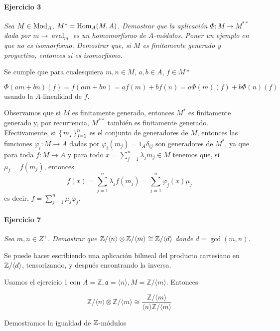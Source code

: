 \documentclass[./ejercicios.tex]{subfiles}
\begin{document}
\paragraph{Ejercicio 3}\textit{Sea $M\in \operatorname{Mod}_A$, $M^* = \operatorname{Hom}_A(M, A)$. Demostrar que la aplicación $\Phi:M\to M^{**}$ dada por $m \to \operatorname{eval}_m$ es un homomorfismo de $A$-módulos. Poner un ejemplo en que no es isomorfismo. Demostrar que, si $M$ es finitamente generado y proyectivo, entonces sí es isomorfismo.}

Se cumple que para cualesquiera $m, n \in M$, $a, b \in A$, $f\in M*$

\begin{equation}
  \Phi(a m+ bn) (f) = f(am+bn) = af(m)+bf(n) = a\Phi(m)(f)+b\Phi (n)(f)
\end{equation}
usando la $A$-linealidad de $f$.

Observamos que si $M$ es finitamente generado, entonces $M^*$ es finitamente generado y, por recurrencia, $M^{**}$ también es finitamente generado. Efectivamente, si $\set{m_j}_{j=1}^n$ es el conjunto de generadores de $M$, entonces las funciones $\varphi_i:M\to A$ dadas por $\varphi_i(m_j)= 1_A \delta_{ij}$ son generadores de $M^*$, ya que para toda $f:M \to A$ y para todo $x=\sum_{j=1}^n\lambda_jm_j\in M$ tenemos que, si $\mu_j = f(m_j)$, entonces
\[f(x) = \sum_{j=1}^n \lambda_j f(m_j) = \sum_{j=1}^n \varphi_j(x) \mu_j  \]
es decir, $f = \sum_{j=1}^n \mu_j \varphi_j$.

\paragraph{Ejercicio 7} \textit{Sea $m,n \in Z^+$. Demostrar que $\mathbb{Z} / \langle n \rangle \otimes \mathbb{Z} / \langle m \rangle \cong \mathbb{Z}/ \langle d \rangle$ donde $d = \gcd(m,n)$.}

Se puede hacer escribiendo una aplicación bilineal del producto cartesiano en $\mathbb{Z}/\langle d \rangle$, tensorizando, y después encontrando la inversa.

Usamos el ejercicio 1 con $A= \mathbb{Z}, \mathfrak{a} = \langle n \rangle, M = \mathbb{Z} / \langle m \rangle$. Entonces

\begin{equation}
  \mathbb{Z}/\langle n\rangle \otimes \mathbb{Z} / \langle m \rangle \cong \frac{\mathbb{Z} / \langle m \rangle }{\langle n \rangle  \mathbb{Z} / \langle m \rangle}
\end{equation}

Demostramos la igualdad de $\mathbb{Z}$-módulos
\end{document}

